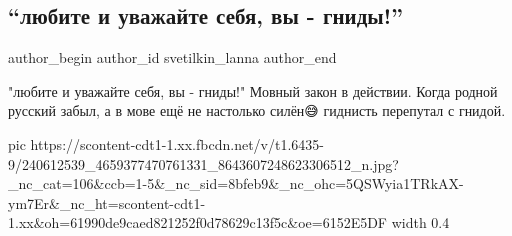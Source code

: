 
 
 
 
 
 
\subsection{\enquote{любите и уважайте себя, вы - гниды!}}
\label{sec:26_08_2021.fb.svetilkin_lanna.1.gnidy_chek}
 
\ifcmt
 author_begin
   author_id svetilkin_lanna
 author_end
\fi

"любите и уважайте себя, вы - гниды!" Мовный закон в действии. Когда родной
русский забыл, а в мове ещё не настолько силён😅  гиднисть перепутал с гнидой.

\ifcmt
  pic https://scontent-cdt1-1.xx.fbcdn.net/v/t1.6435-9/240612539_4659377470761331_8643607248623306512_n.jpg?_nc_cat=106&ccb=1-5&_nc_sid=8bfeb9&_nc_ohc=5QSWyia1TRkAX-ym7Er&_nc_ht=scontent-cdt1-1.xx&oh=61990de9caed821252f0d78629c13f5c&oe=6152E5DF
  width 0.4
\fi
